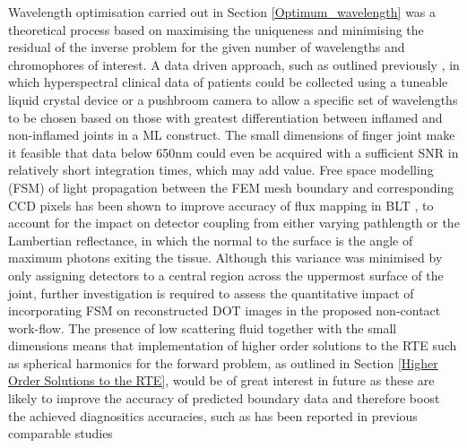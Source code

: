 \documentclass[twoside]{bhamthesis}
\theoremstyle{definition}
\begin{document}
Wavelength optimisation carried out in Section \ref{Optimum_wavelength} was a theoretical process based on maximising the uniqueness and minimising the residual of the inverse problem for the given number of wavelengths and chromophores of interest. A data driven approach, such as outlined previously \cite{dempsey2015data}, in which hyperspectral clinical data of patients could be collected using a tuneable liquid crystal device \cite{woltman2007liquid} or a pushbroom camera \cite{li2013review} to allow a specific set of wavelengths to be chosen based on those with greatest differentiation between inflamed and non-inflamed joints in a ML construct. The small dimensions of finger joint make it feasible that data below 650nm could even be acquired with a sufficient SNR in relatively short integration times, which may add value. Free space modelling (FSM) of light propagation between the FEM mesh boundary and corresponding CCD pixels has been shown to improve accuracy of flux mapping in BLT \cite{guggenheim2014multi}, to account for the impact on detector coupling from either varying pathlength or the Lambertian reflectance, in which the normal to the surface is the angle of maximum photons exiting the tissue. Although this variance was minimised by only assigning detectors to a central region across the uppermost surface of the joint, further investigation is required to assess the quantitative impact of incorporating FSM on reconstructed DOT images in the proposed non-contact work-flow. The presence of low scattering fluid together with the small dimensions means that implementation of higher order solutions to the RTE such as spherical harmonics for the forward problem, as outlined in Section \ref{Higher Order Solutions to the RTE}, would be of great interest in future as these are likely to improve the accuracy of predicted boundary data and therefore boost the achieved diagnositics accuracies, such as has been reported in previous comparable studies \cite{montejo2014computational,yuan2009comparison}
\end{document}
